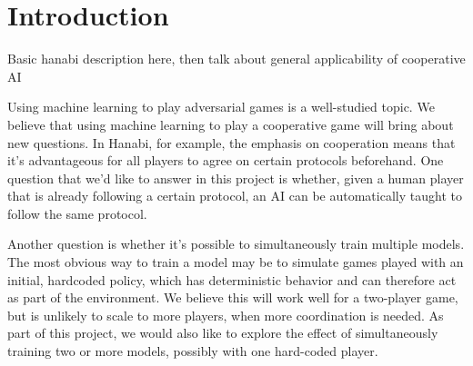\section{Introduction}
\label{intro}

Basic hanabi description here, then talk about general applicability of cooperative AI

Using machine learning to play adversarial games is a well-studied topic. We believe that using machine learning to play a cooperative game will bring about new questions. In Hanabi, for example, the emphasis on cooperation means that it’s advantageous for all players to agree on certain protocols beforehand. One question that we’d like to answer in this project is whether, given a human player that is already following a certain protocol, an AI can be automatically taught to follow the same protocol.

Another question is whether it’s possible to simultaneously train multiple models. The most obvious way to train a model may be to simulate games played with an initial, hardcoded policy, which has deterministic behavior and can therefore act as part of the environment. We believe this will work well for a two-player game, but is unlikely to scale to more players, when more coordination is needed. As part of this project, we would also like to explore the effect of simultaneously training two or more models, possibly with one hard-coded player.
